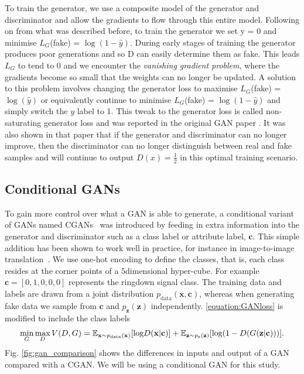 \documentclass[12pt]{iopart}
\newcommand{\ndimensional}[1]{$#1$\nobreakdash\discretionary{-}{-}{-}dimensional}
\begin{document}
To train the generator, we use a composite model of the generator and discriminator and allow the gradients to flow through this entire model. Following on from what was described before, to train the generator we set y = 0 and minimise $L_{G}$(fake) = $\log(1-\hat{y})$. During early stages of training the generator produces poor generations and so D can easily determine them as fake. This leads $L_{G}$ to tend to 0 and we encounter the \textit{vanishing gradient problem}, where the gradients become so small that the weights can no longer be updated. A solution to this problem involves changing the generator loss to maximise $L_{G}$(fake) = $\log(\hat{y})$ or equivalently continue to minimise $L_{G}$(fake) = $\log(1-\hat{y})$ and simply switch the $y$ label to 1. This tweak to the generator loss is called non-saturating generator loss and was reported in the original \ac{GAN} paper \cite{Goodfellow2014}. It was also shown in that paper that if the generator and discriminator can no longer improve, then the discriminator can no longer distinguish between real and fake samples and will continue to output $D(x) = \frac{1}{2}$ in this optimal training scenario. 

\subsection{Conditional GANs}

%
To gain more control over what a \ac{GAN} is able to generate, a conditional variant
of \acp{GAN} named \acp{CGAN}~\cite{cgan} was introduced by feeding in extra
information into the generator and discriminator such as a class label or
attribute label, $\mathbf{c}$. This simple addition has been shown to work well in practice, for instance in image-to-image translation~\cite{isola2016imagetoimage}. We use one-hot encoding to define the classes, that is, each class resides at the corner points of a \ndimensional{5} hyper-cube. For example $\mathbf{c}=[0,1,0,0,0]$ represents the ringdown signal class. The training data and labels are drawn from a joint distribution $p_{\text{data}}(\mathbf{x},\mathbf{c})$, whereas when generating fake data we sample from $\mathbf{c}$ and $p_{\mathbf{z}}(\mathbf{z})$ independently. \cref{equation:GANloss} is modified to include the class labels 
~
\begin{equation}
   \mathop{\text{min}}_{G}  \mathop{\text{max}}_{D} V(D,G) = \mathbb{E}_{\mathbf{x} \sim p_{\text{\text{data}}}(\mathbf{x})} [\text{log} D(\mathbf{x|c})] + \mathbb{E}_{\mathbf{z} \sim p_{\text{z}}(\mathbf{z})} [\text{log}(1-D(G(\mathbf{z|c})))].
 \label{equation:CGANloss}
 \end{equation}
Fig. \ref{fig:gan_comparison} shows the differences in inputs and output of a GAN compared with a \ac{CGAN}. We will be using a conditional GAN for this study.
\end{document}
